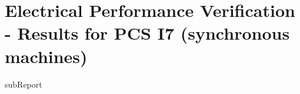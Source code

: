 \renewcommand{\DTRPcs}{I7SM} %
\renewcommand{\DTRPcsLong}{I7 (synchronous machines)}


    \section{Electrical Performance Verification - Results for PCS \DTRPcsLong}

    {{subReport}}
    \newpage

